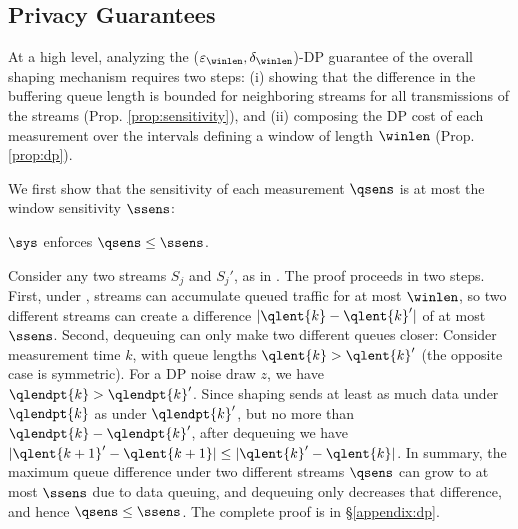 \subsection{Privacy Guarantees}
\label{subsec:dp-proof}
At a high level, analyzing the  ($\varepsilon_{\winlen}, \delta_{\winlen}$)-DP
guarantee of the overall shaping mechanism requires two steps: (i) showing that
the difference in the buffering queue length is bounded for neighboring streams
for all transmissions of the streams (Prop. \ref{prop:sensitivity}), and (ii)
composing the DP cost of each measurement over the intervals defining a window
of length $\winlen$ (Prop. \ref{prop:dp}).

We first show that the sensitivity of each measurement $\qsens$ is at most the
window sensitivity $\ssens$:
\begin{proposition}\label{prop:sensitivity}
    {$\sys$} enforces $\qsens \leq \ssens$.
\end{proposition}

\begin{proofsketch}
  Consider any two streams $S_j$ and $S_j'$, as in .
  The proof proceeds in two steps. First, under ,
  streams can accumulate queued traffic for at most {$\winlen$}, so two
  different streams can create a difference $|\qlent{k} - \qlent{k}'|$ of at
  most $\ssens$.
  Second, dequeuing can only make two different queues closer: Consider
  measurement time $k$, with queue lengths $\qlent{k} > \qlent{k}'$ (the
  opposite case is symmetric).
  For a DP noise draw $z$, we have $\qlendpt{k} > \qlendpt{k}'$. Since shaping
  sends at least as much data under $\qlendpt{k}$ as under $\qlendpt{k}'$,
  but no more than $\qlendpt{k} - \qlendpt{k}'$, after dequeuing we have
  $|\qlent{k+1}' - \qlent{k+1}| \leq |\qlent{k}' - \qlent{k}|$.
  In summary, the maximum queue difference under two different streams
  $\qsens$ can grow to at most $\ssens$ due to data queuing, and dequeuing only
  decreases that difference, and hence $\qsens \leq \ssens$.  The complete proof
  is in \S\ref{appendix:dp}.
\end{proofsketch}

